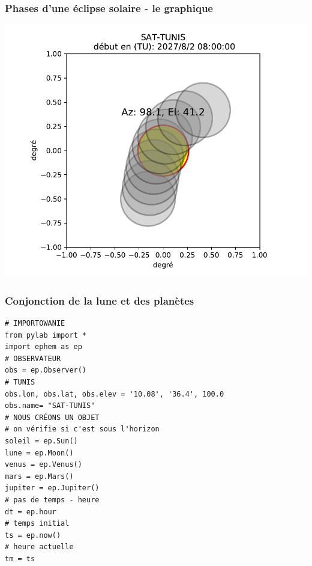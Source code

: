 \documentclass{beamer}
\begin{document}
\begin{frame}
\frametitle{Phases d'une éclipse solaire - le graphique}

\vspace{6mm}

\centerline{\includegraphics[width=0.9\linewidth]{figs/eclipse_sol.pdf}}

\vspace{6mm}
\end{frame}

\begin{frame}
\frametitle{Conjonction de la lune et des planètes}

\begin{verbatim}
# IMPORTOWANIE
from pylab import *
import ephem as ep
# OBSERVATEUR
obs = ep.Observer()
# TUNIS
obs.lon, obs.lat, obs.elev = '10.08', '36.4', 100.0
obs.name= "SAT-TUNIS"
# NOUS CRÉONS UN OBJET
# on vérifie si c'est sous l'horizon
soleil = ep.Sun()
lune = ep.Moon()
venus = ep.Venus()
mars = ep.Mars()
jupiter = ep.Jupiter()
# pas de temps - heure
dt = ep.hour
# temps initial
ts = ep.now()
# heure actuelle
tm = ts
\end{verbatim}
\end{frame}
\end{document}
